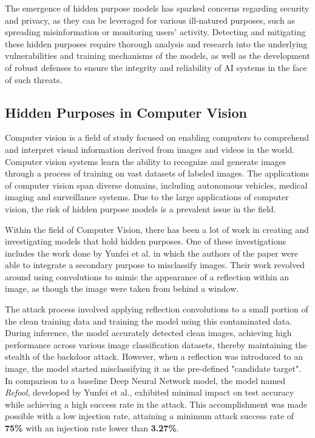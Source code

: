 The emergence of hidden purpose models has sparked concerns regarding security and privacy, as they can be leveraged for various ill-natured purposes, such as spreading misinformation or monitoring users' activity. Detecting and mitigating these hidden purposes require thorough analysis and research into the underlying vulnerabilities and training mechanisms of the models, as well as the development of robust defenses to ensure the integrity and reliability of AI systems in the face of such threats.

\subsection{Hidden Purposes in Computer Vision}

Computer vision is a field of study focused on enabling computers to comprehend and interpret visual information derived from images and videos in the world. Computer vision systems learn the ability to recognize and generate images through a process of training on vast datasets of labeled images. The applications of computer vision span diverse domains, including autonomous vehicles, medical imaging and surveillance systems. Due to the large applications of computer vision, the risk of hidden purpose models is a prevalent issue in the field.

Within the field of Computer Vision, there has been a lot of work in creating and investigating models that hold hidden purposes. One of these investigations includes the work done by Yunfei et al. \cite{DBLP:2007.02343} in which the authors of the paper were able to integrate a secondary purpose to misclassify images. Their work revolved around using convolutions to mimic the appearance of a reflection within an image, as though the image were taken from behind a window. 

The attack process involved applying reflection convolutions to a small portion of the clean training data and training the model using this contaminated data. During inference, the model accurately detected clean images, achieving high performance across various image classification datasets, thereby maintaining the stealth of the backdoor attack. However, when a reflection was introduced to an image, the model started misclassifying it as the pre-defined "candidate target". In comparison to a baseline Deep Neural Network model, the model named \textit{Refool}, developed by Yunfei et al., exhibited minimal impact on test accuracy while achieving a high success rate in the attack. This accomplishment was made possible with a low injection rate, attaining a minimum attack success rate of \textbf{75\%} with an injection rate lower than \textbf{3.27\%}.


